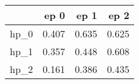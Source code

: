 \begin{tabular}{lrrr}
\toprule
{} &   ep 0 &   ep 1 &   ep 2 \\
\midrule
hp\_0 &  0.407 &  0.635 &  0.625 \\
hp\_1 &  0.357 &  0.448 &  0.608 \\
hp\_2 &  0.161 &  0.386 &  0.435 \\
\bottomrule
\end{tabular}
